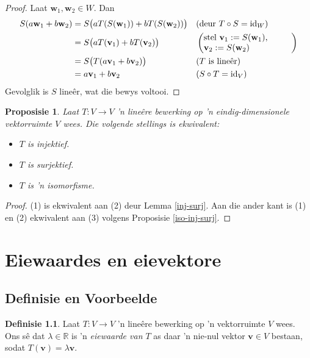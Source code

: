 \documentclass[a4paper,11pt]{book}
\newtheorem{proposition}[theorem]{Proposisie}
\theoremstyle{definition}
\newtheorem{definition}[theorem]{Definisie}
\newcommand{\ve}[1]{\mathbf{#1}}
\DeclareMathOperator{\id}{id}
\begin{document}
\begin{proof}
	Laat $\ve{w}_1, \ve{w}_2 \in W$. Dan
	\begin{align*}
		S( a \ve{w}_1 + b \ve{w}_2) &= S\big(a T(S(\ve{w}_1)) + b
		T(S(\ve{w}_2)) \big) && \mbox{(deur $T \circ S = \id_W$)} \\
		&= S\big( a T(\ve{v}_1) + b T(\ve{v}_2) \big) &&
		\left(\mbox{\begin{minipage}{3.5cm}
			stel $\ve{v}_1 := S(\ve{w}_1)$, \\ 
			$\ve{v}_2 := S(\ve{w}_2)$ 
		\end{minipage} } \right)
		\\
		&= S\big(T(a \ve{v}_1 + b \ve{v}_2)\big) && \mbox{($T$ is
		line{\^e}r)} \\
		&= a \ve{v}_1 + b \ve{v}_2 && \mbox{($S \circ T = \id_V$)}
	\end{align*}
	Gevolglik is $S$ line{\^e}r, wat die bewys voltooi.
\end{proof}

\begin{proposition} \label{equiv-inj-sur-iso} Laat $T : V \rightarrow V$ 'n
	line{\^e}re bewerking op 'n eindig-dimensionele vektorruimte $V$ wees.
	Die volgende stellings is ekwivalent:
	\begin{itemize}
		\item[1.] $T$ is injektief.
		\item[2.] $T$ is surjektief.
		\item[3.] $T$ is 'n isomorfisme.
	\end{itemize}
\end{proposition}
\begin{proof} (1) is ekwivalent aan (2) deur Lemma \ref{inj-surj}. Aan die
	ander kant is (1) en (2) ekwivalent aan (3) volgens Proposisie
	\ref{iso-inj-surj}.
\end{proof}



\chapter{Eiewaardes en eievektore}\label{ACh4EigenvaluesEigenvectors}
\section{Definisie en Voorbeelde}\label{ACh4Sec1DefsAndExamples}
\begin{definition} Laat $T : V \rightarrow V$ 'n line{\^e}re bewerking op
	'n vektorruimte $V$ wees. Ons s{\^e} dat $\lambda \in \mathbb{R}$ is 'n
	\emph{eiewaarde van $T$} as daar 'n nie-nul vektor $\ve{v} \in V$
	bestaan, sodat $T(\ve{v}) = \lambda \ve{v}$.
\end{definition}
\end{document}
